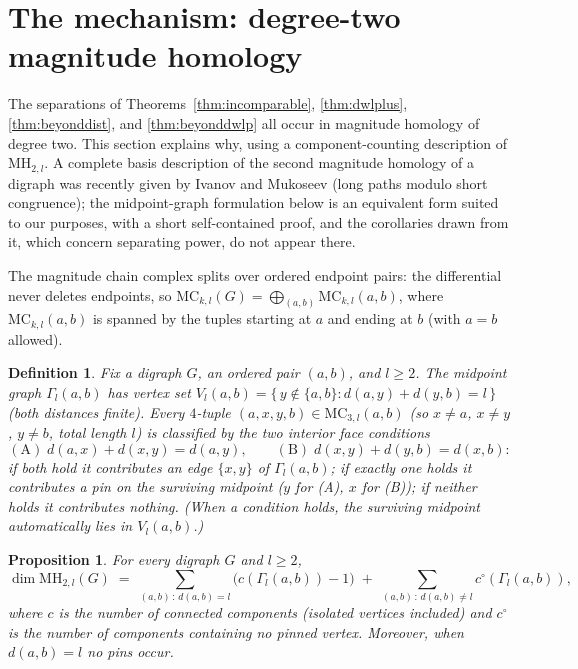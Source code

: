 \documentclass[pdflatex,sn-mathphys,Numbered]{sn-jnl}
\theoremstyle{thmstyleone}
\newtheorem{proposition}[theorem]{Proposition}
\theoremstyle{thmstyletwo}
\newtheorem{definition}[theorem]{Definition}
\newcommand{\MH}{\mathrm{MH}}
\newcommand{\MC}{\mathrm{MC}}
\begin{document}
\section{The mechanism: degree-two magnitude homology}\label{sec:mech}

The separations of Theorems~\ref{thm:incomparable}, \ref{thm:dwlplus},
\ref{thm:beyonddist}, and \ref{thm:beyonddwlp} all occur in magnitude
homology of degree two.
This section explains why, using a component-counting description of
$\MH_{2,l}$. A complete basis description of the second magnitude
homology of a digraph was recently given by Ivanov and Mukoseev
\cite{IvanovMukoseev24} (long paths modulo short congruence); the
midpoint-graph formulation below is an equivalent form suited to our
purposes, with a short self-contained proof, and the corollaries drawn
from it, which concern separating power, do not appear there.

The magnitude chain complex splits over ordered endpoint pairs: the
differential never deletes endpoints, so
$\MC_{k,l}(G) = \bigoplus_{(a,b)} \MC_{k,l}(a,b)$, where
$\MC_{k,l}(a,b)$ is spanned by the tuples starting at $a$ and ending at
$b$ (with $a = b$ allowed).

\begin{definition}\label{def:midpointgraph}
Fix a digraph $G$, an ordered pair $(a,b)$, and $l \ge 2$. The
\emph{midpoint graph} $\Gamma_l(a,b)$ has vertex set
$V_l(a,b) = \{\, y \notin \{a,b\} : d(a,y) + d(y,b) = l \,\}$ (both
distances finite). Every $4$-tuple $(a,x,y,b) \in \MC_{3,l}(a,b)$
(so $x \ne a$, $x \ne y$, $y \ne b$, total length $l$) is classified by
the two interior face conditions
\[
\mathrm{(A)}\; d(a,x) + d(x,y) = d(a,y), \qquad
\mathrm{(B)}\; d(x,y) + d(y,b) = d(x,b):
\]
if both hold it contributes an \emph{edge} $\{x, y\}$ of
$\Gamma_l(a,b)$; if exactly one holds it contributes a \emph{pin} on
the surviving midpoint ($y$ for (A), $x$ for (B)); if neither holds it
contributes nothing. (When a condition holds, the surviving midpoint
automatically lies in $V_l(a,b)$.)
\end{definition}

\begin{proposition}\label{prop:mh2structure}
For every digraph $G$ and $l \ge 2$,
\[
\dim \MH_{2,l}(G) \;=\;
\sum_{(a,b)\,:\,d(a,b) = l} \bigl(c(\Gamma_l(a,b)) - 1\bigr)
\;+\;
\sum_{(a,b)\,:\,d(a,b) \ne l} c^{\circ}(\Gamma_l(a,b)),
\]
where $c$ is the number of connected components (isolated vertices
included) and $c^{\circ}$ is the number of components containing no
pinned vertex. Moreover, when $d(a,b) = l$ no pins occur.
\end{proposition}
\end{document}
